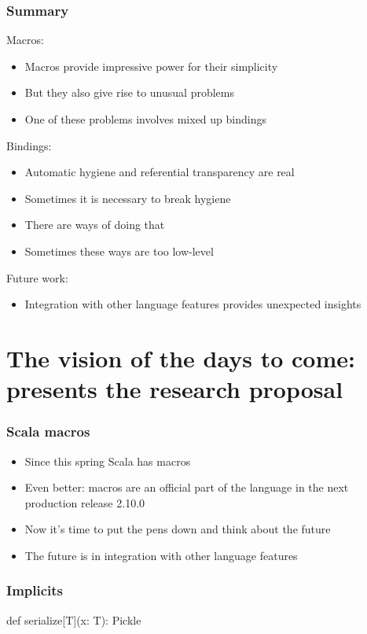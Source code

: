 \documentclass[svgnames,hyperref={bookmarks=false}]{beamer}
\begin{document}
\begin{frame}[fragile]
\frametitle{Summary}
Macros:
\begin{itemize}
\item Macros provide impressive power for their simplicity
\item But they also give rise to unusual problems
\item One of these problems involves mixed up bindings
\end{itemize}

\pause
Bindings:
\begin{itemize}
\item Automatic hygiene and referential transparency are real
\item Sometimes it is necessary to break hygiene
\item There are ways of doing that
\item Sometimes these ways are too low-level
\end{itemize}

\pause
Future work:
\begin{itemize}
\item Integration with other language features provides unexpected insights
\end{itemize}
\end{frame}

\section{The vision of the days to come: presents the research proposal}

\begin{frame}[fragile]
\frametitle{Scala macros}
\begin{itemize}
\item Since this spring Scala has macros
\item Even better: macros are an official part of the language in the next production release 2.10.0
\item Now it's time to put the pens down and think about the future
\item The future is in integration with other language features
\end{itemize}
\end{frame}

\begin{frame}[fragile]
\frametitle{Implicits}
\begin{semiverbatim}
def serialize[T](x: T): Pickle

\end{semiverbatim}
\end{frame}
\end{document}
